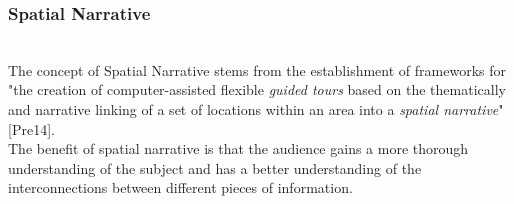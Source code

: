 \begin{frame}
  \frametitle{Spatial Narrative}
  \begin{module}[id=spatialNarrative]
\\
\noindent
The concept of Spatial Narrative stems from the establishment of frameworks for "the creation of computer-assisted flexible \textit{guided tours} based on the thematically and narrative linking of a set of locations within an area into a \textit{spatial narrative}" [Pre14].\\

\noindent
The benefit of spatial narrative is that the audience gains a more thorough understanding of the subject and has a better understanding of the interconnections between different pieces of information. \\

  \end{module}
\end{frame}
